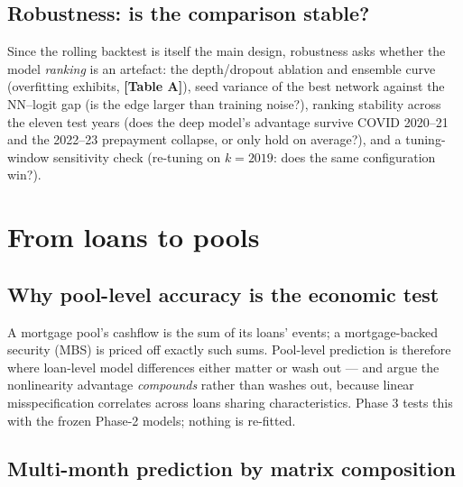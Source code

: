 \documentclass[11pt,a4paper]{article}
\newcommand{\artifact}[1]{\textbf{[#1]}}
\begin{document}
\subsection{Robustness: is the comparison stable?}

Since the rolling backtest is itself the main design, robustness asks whether the model \emph{ranking} is an artefact: the depth/dropout ablation and ensemble curve (overfitting exhibits, \artifact{Table A}), seed variance of the best network against the NN--logit gap (is the edge larger than training noise?), ranking stability across the eleven test years (does the deep model's advantage survive COVID 2020--21 and the 2022--23 prepayment collapse, or only hold on average?), and a tuning-window sensitivity check (re-tuning on $k{=}2019$: does the same configuration win?).

\section{From loans to pools}\label{sec:pool}

\subsection{Why pool-level accuracy is the economic test}

A mortgage pool's cashflow is the sum of its loans' events; a mortgage-backed security (MBS) is priced off exactly such sums. Pool-level prediction is therefore where loan-level model differences either matter or wash out --- and \citet{sirignano2021} argue the nonlinearity advantage \emph{compounds} rather than washes out, because linear misspecification correlates across loans sharing characteristics. Phase 3 tests this with the frozen Phase-2 models; nothing is re-fitted.

\subsection{Multi-month prediction by matrix composition}
\end{document}
